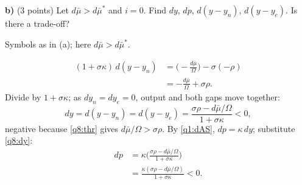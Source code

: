 \textbf{b)} (3 points) Let $d\bar\mu>d\bar\mu^*$ and $i=0$. Find $dy$, $dp$, $d(y-y_n)$, $d(y-y_e)$. Is there a trade-off?
\resolespaco
\begin{sol}
\begin{notacao}
\item Symbols as in (a); here $d\bar\mu>d\bar\mu^*$.
\end{notacao}
\begin{align}
(1+\sigma\kappa)\,d(y-y_n)&=\Big(-\frac{d\bar\mu}{\Omega}\Big)-\sigma(-\rho)\nonumber\\
&=-\frac{d\bar\mu}{\Omega}+\sigma\rho . \nonumber
\end{align}
Divide by $1+\sigma\kappa$; as $dy_n=dy_e=0$, output and both gaps move together:
\begin{equation}
dy=d(y-y_n)=d(y-y_e)=\frac{\sigma\rho-d\bar\mu/\Omega}{1+\sigma\kappa}<0 , \label{q8:dy}
\end{equation}
negative because \eqref{q8:thr} gives $d\bar\mu/\Omega>\sigma\rho$. By \eqref{q1:dAS}, $dp=\kappa\,dy$; substitute \eqref{q8:dy}:
\begin{align}
dp&=\kappa\Big(\frac{\sigma\rho-d\bar\mu/\Omega}{1+\sigma\kappa}\Big)\nonumber\\
&=\frac{\kappa(\sigma\rho-d\bar\mu/\Omega)}{1+\sigma\kappa}<0 . \nonumber
\end{align}
\end{sol}

